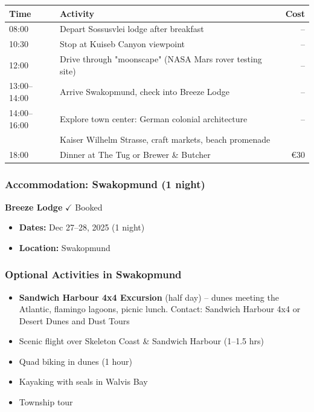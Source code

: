 \documentclass[11pt]{article}
\newcommand{\booked}{\textcolor{accentcolor}{$\checkmark$ Booked}}
\begin{document}
\begin{tabular}{llr}
\toprule
\textbf{Time} & \textbf{Activity} & \textbf{Cost} \\
\midrule
08:00 & Depart Sossusvlei lodge after breakfast & -- \\
10:30 & Stop at Kuiseb Canyon viewpoint & -- \\
12:00 & Drive through "moonscape" (NASA Mars rover testing site) & -- \\
13:00--14:00 & Arrive Swakopmund, check into Breeze Lodge & -- \\
14:00--16:00 & Explore town center: German colonial architecture & -- \\
& Kaiser Wilhelm Strasse, craft markets, beach promenade & \\
18:00 & Dinner at The Tug or Brewer \& Butcher & €30 \\
\bottomrule
\end{tabular}

\subsubsection{Accommodation: Swakopmund (1 night)}

\textbf{Breeze Lodge} \hfill \booked

\begin{itemize}
    \item \textbf{Dates:} Dec 27--28, 2025 (1 night)
    \item \textbf{Location:} Swakopmund
\end{itemize}

\subsubsection{Optional Activities in Swakopmund}

\begin{itemize}
    \item \textbf{Sandwich Harbour 4x4 Excursion} (half day) -- dunes meeting the Atlantic, flamingo lagoons, picnic lunch. Contact: Sandwich Harbour 4x4 or Desert Dunes and Dust Tours
    \item Scenic flight over Skeleton Coast \& Sandwich Harbour (1--1.5 hrs)
    \item Quad biking in dunes (1 hour)
    \item Kayaking with seals in Walvis Bay
    \item Township tour
\end{itemize}
\end{document}
